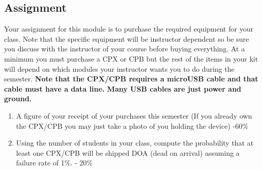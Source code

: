 \subsection{Assignment}
Your assignment for this module is to purchase the required equipment for your class. Note that the specific equipment will be instructor dependent so be sure you discuss with the instructor of your course before buying everything. At a minimum you must purchase a CPX or CPB but the rest of the items in your kit will depend on which modules your instructor wants you to do during the semester. {\bf Note that the CPX/CPB requires a microUSB cable and that cable must have a data line. Many USB cables are just power and ground.}



\begin{enumerate}[itemsep=-5pt]
\item A figure of your receipt of your purchases this semester (If you already own the CPX/CPB you may just take a photo of you holding the device) -60\%
\item Using the number of students in your class, compute the probability that at least one CPX/CPB will be shipped DOA (dead on arrival) assuming a failure rate of 1\%. - 20\%
\end{enumerate}


